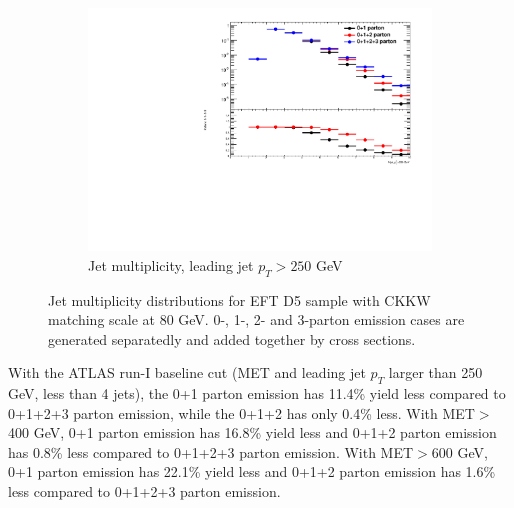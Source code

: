 \begin{figure} [thbp]
\begin{subfigure}{0.48\linewidth}
    \includegraphics[width=\linewidth]{figures/monojet_appendix/h_njet250.pdf}
    \caption{Jet multiplicity, leading jet $p_{T}>250$ GeV}
  \end{subfigure}
  \caption{Jet multiplicity distributions for EFT D5 sample with CKKW matching scale at 80 GeV. 0-, 1-, 2- and 3-parton emission cases are generated separatedly and added together by cross sections.}
  \label{fig:RatioKine_D5}
\end{figure}

With the ATLAS run-I baseline cut (MET and leading jet $p_{T}$ larger than 250 GeV, less than 4 jets), the 0+1 parton emission has 11.4\% yield less compared to 0+1+2+3 parton emission, while the 0+1+2 has only 0.4\% less. With MET$>$400 GeV, 0+1 parton emission has 16.8\% yield less and 0+1+2 parton emission has 0.8\% less compared to 0+1+2+3 parton emission. With MET$>$600 GeV, 0+1 parton emission has 22.1\% yield less and 0+1+2 parton emission has 1.6\% less compared to 0+1+2+3 parton emission.
